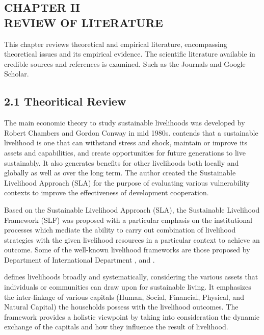 \documentclass[12pt, a4paper]{article}
\begin{document}
\clearpage

\begin{center}
\section*{\large{CHAPTER II \\ \vspace{-0.3cm} REVIEW OF LITERATURE}}
\end{center}
\renewcommand{\thepage}{\arabic{page}}
This chapter reviews theoretical and empirical literature, encompassing theoretical
issues and its empirical evidence. The scientific literature available in credible sources
and references is examined. Such as the Journals and Google Scholar.\\
\subsection*{2.1  Theoritical Review}
\renewcommand{\thepage}{\arabic{page}}
The main economic theory to study sustainable livelihoods was developed by Robert Chambers and Gordon Conway in mid 1980s. \cite{chambers1992sustainable} contends that a sustainable livelihood is one that can withstand stress and shock, maintain or improve its assets and capabilities, and create opportunities for future generations to live sustainably. It also generates benefits for other livelihoods both locally and globally as well as over the long term. The author created the Sustainable Livelihood Approach (SLA) for the purpose of evaluating various vulnerability contexts to improve the effectiveness of development cooperation. 

Based on the Sustainable Livelihood Approach (SLA), the Sustainable Livelihood Framework (SLF) was proposed with a particular emphasis on the institutional processes which mediate the ability to carry out combination of livelihood strategies with the given livelihood resources in a particular context to achieve an outcome. Some of the well-known livelihood frameworks are those proposed by Department of International Department \cite{dfid1999sustainable}, \cite{ellis1999rural} and \cite{scoones2013livelihoods}. 

\cite{dfid1999sustainable} defines livelihoods broadly and systematically, considering the various assets that individuals or communities can draw upon for sustainable living. It emphasizes the inter-linkage of various capitals (Human, Social, Financial, Physical, and Natural Capital) the households possess with the livelihood outcomes. The framework provides a holistic viewpoint by taking into consideration the dynamic exchange of the capitals and how they influence the result of livelihood. 
\end{document}
